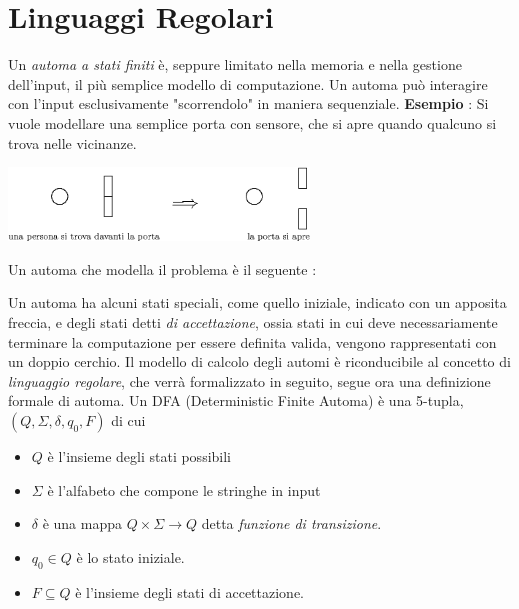 \documentclass[10pt, letterpaper]{report}
\begin{document}
\section{Linguaggi Regolari}
Un \textit{automa a 
stati finiti} è, seppure limitato nella memoria e nella gestione 
dell'input, il più 
semplice modello di computazione. Un automa può interagire con l'input 
esclusivamente "scorrendolo" in maniera sequenziale.\acc 
\textbf{Esempio} : Si vuole modellare una semplice porta con sensore, che 
si apre quando qualcuno si trova nelle vicinanze.
\begin{center}
    \includegraphics[width=0.6\textwidth ]{images/porta.eps}
\end{center}
Un automa che modella il problema è il seguente :\begin{center}
    
    
\end{center} 
Un automa ha alcuni stati speciali, come quello iniziale, indicato 
con un apposita freccia, e degli stati detti \textit{di accettazione}, 
ossia stati in cui deve necessariamente terminare la computazione per 
essere definita valida, vengono rappresentati con un doppio cerchio.
\acc 
Il modello di calcolo degli automi è riconducibile al concetto di 
\textit{linguaggio regolare}, che verrà formalizzato in seguito, 
segue ora una definizione formale di automa.\acc 
{}  Un DFA (Deterministic Finite Automa) è una 
5-tupla, $(Q,\Sigma,\delta, q_0, F)$ di cui\begin{itemize}
    \item $Q$ è l'insieme degli stati possibili 
    \item $\Sigma$ è l'alfabeto che compone le stringhe in input 
    \item $\delta$ è una mappa $Q\times \Sigma \rightarrow Q$ detta 
    \textit{funzione di transizione}. 
    \item $q_0\in Q$ è lo stato iniziale. 
    \item $F\subseteq Q$ è l'insieme degli stati di accettazione.
\end{itemize}
\end{document}
